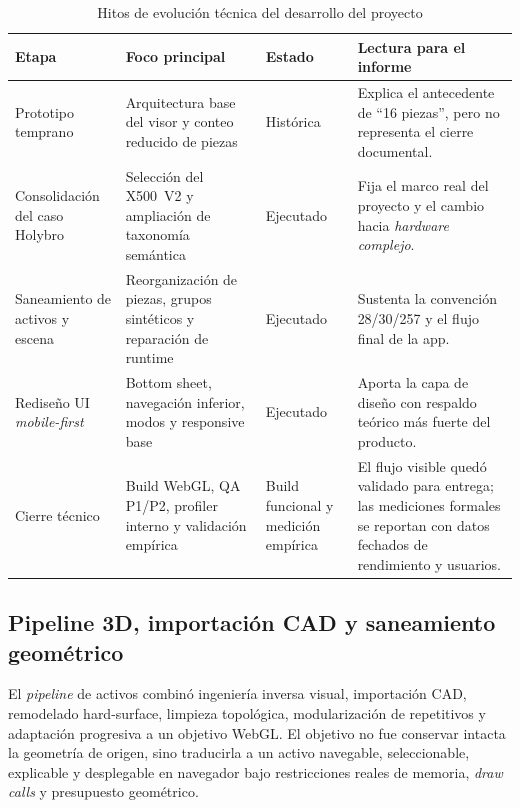 \begin{table}[H]
    \caption{Hitos de evolución técnica del desarrollo del proyecto}
    \label{tab:hitos_desarrollo_proyecto}
    \centering
    \small
    \begin{tabular}{p{2.8cm}p{4.0cm}p{2.6cm}p{5.0cm}}
        \hline
        \textbf{Etapa} & \textbf{Foco principal} & \textbf{Estado} & \textbf{Lectura para el informe} \\ \hline
        Prototipo temprano & Arquitectura base del visor y conteo reducido de piezas & Histórica & Explica el antecedente de ``16 piezas'', pero no representa el cierre documental. \\
        Consolidación del caso Holybro & Selección del X500~V2 y ampliación de taxonomía semántica & Ejecutado & Fija el marco real del proyecto y el cambio hacia \textit{hardware complejo}. \\
        Saneamiento de activos y escena & Reorganización de piezas, grupos sintéticos y reparación de runtime & Ejecutado & Sustenta la convención 28/30/257 y el flujo final de la app. \\
        Rediseño UI \textit{mobile-first} & Bottom sheet, navegación inferior, modos y responsive base & Ejecutado & Aporta la capa de diseño con respaldo teórico más fuerte del producto. \\
        Cierre técnico & Build WebGL, QA P1/P2, profiler interno y validación empírica & Build funcional y medición empírica & El flujo visible quedó validado para entrega; las mediciones formales se reportan con datos fechados de rendimiento y usuarios. \\ \hline
    \end{tabular}
    \par\vspace{0.5\baselineskip}
\end{table}

\subsection{Pipeline 3D, importación CAD y saneamiento geométrico}

El \textit{pipeline} de activos combinó ingeniería inversa visual, importación CAD, remodelado hard-surface, limpieza topológica, modularización de repetitivos y adaptación progresiva a un objetivo WebGL. El objetivo no fue conservar intacta la geometría de origen, sino traducirla a un activo navegable, seleccionable, explicable y desplegable en navegador bajo restricciones reales de memoria, \textit{draw calls} y presupuesto geométrico.

